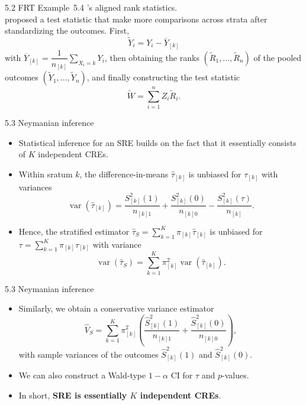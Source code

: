 \documentclass[aspectratio=169, 12pt]{beamer}
\begin{document}
\begin{frame}{5.2 FRT}
  Example~5.4 \citet{hodges2011rank}'s aligned rank statistics.\\
  \citet{hodges2011rank} proposed a test statistic that make more comparisons across strata after standardizing the outcomes. First,
  \[
  \widetilde{Y}_i=Y_i-\overline{Y}_{[k]}
  \]
  with $\overline{Y}_{[k]}=\dfrac{1}{n_{[k]}}\sum_{X_i=k}^{}Y_i$, then obtaining the ranks $(\widetilde{R}_1,\dots,\widetilde{R}_n)$ of the pooled outcomes $(\widetilde{Y}_1,\dots,\widetilde{Y}_n)$, and finally constructing the test statistic
  \[
  \widetilde{W} = \sum_{i=1}^{n}Z_i\widetilde{R}_i.
  \]
\end{frame}

\begin{frame}{5.3 Neymanian inference}
  \begin{itemize}
    \item Statistical inference for an SRE builds on the fact that it essentially consists of $K$ independent CREs.
    \item Within sratum $k$, the difference-in-means $\widehat{\tau}_{[k]}$ is unbiased for $\tau_{[k]}$ with variances
    \[
    \operatorname{var}(\widehat{\tau}_{[k]}) = \frac{S_{[k]}^2(1)}{n_{[k]1}} + \frac{S_{[k]}^2(0)}{n_{[k]0}} - \frac{S_{[k]}^2(\tau)}{n_{[k]}}.
    \]
    \item Hence, the stratified estimator $\widehat{\tau}_S=\sum_{k=1}^{K}\pi_{[k]}\widehat{\tau}_{[k]}$ is unbiased for $\tau=\sum_{k=1}^{K}\pi_{[k]}\tau_{[k]}$ with variance $$\operatorname{var}(\widehat{\tau}_S)=\sum_{k=1}^{K}\pi_{[k]}^2\operatorname{var}(\widehat{\tau}_{[k]}).$$
  \end{itemize}
\end{frame}

\begin{frame}{5.3 Neymanian inference}
  \begin{itemize}
    \item Similarly, we obtain a conservative variance estimator
    \[
    \widehat{V}_S = \sum_{k=1}^{K}\pi_{[k]}^2\left(\frac{\widehat{S}_{[k]}^2(1)}{n_{[k]1}} + \frac{\widehat{S}_{[k]}^2(0)}{n_{[k]0}}\right),
    \]
    with sample variances of the outcomes $\widehat{S}_{[k]}^2(1)$ and $\widehat{S}_{[k]}^2(0)$.
    \item We can also construct a Wald-type $1-\alpha$ CI for $\tau$ and $p$-values.
    \item In short, \textbf{SRE is essentially $K$ independent CREs}.
  \end{itemize}
\end{frame}
\end{document}
